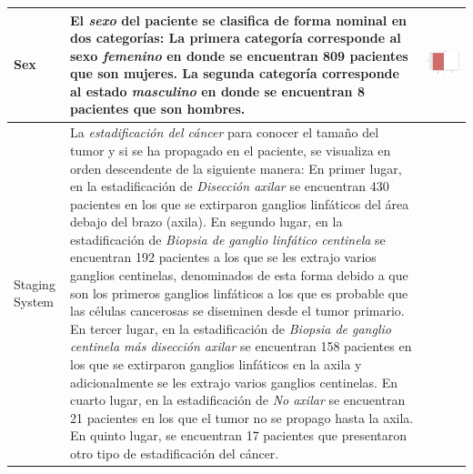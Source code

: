 \begin{table}[!htb]
	\footnotesize
	\begin{threeparttable}
		\begin{tabular}{p{2.5cm} p{7cm} p{6.5cm}} \toprule
			
			Sex
			& El \textit{sexo} del paciente se clasifica de forma nominal en dos categorías: La primera categoría corresponde al sexo \textit{femenino} en donde se encuentran 809 pacientes que son mujeres. La segunda categoría corresponde al estado \textit{masculino} en donde se encuentran 8 pacientes que son hombres.
			
			& \begin{center}\includegraphics[width=1\linewidth]{NOTEBOOK/IMAGENES_DESCRIPTIVAS/39_sex}\end{center}
			\\ \hline
			
					
			Staging System
			& La \textit{estadificación del cáncer} para conocer el tamaño del tumor y si se ha propagado en el paciente, se visualiza en orden descendente de la siguiente manera: En primer lugar, en la estadificación de \textit{Disección axilar} se encuentran 430 pacientes en los que se extirparon ganglios linfáticos del área debajo del brazo (axila). En segundo lugar, en la estadificación de \textit{Biopsia de ganglio linfático centinela} se encuentran 192 pacientes a los que se les extrajo varios ganglios centinelas, denominados de esta forma debido a que son los primeros ganglios linfáticos a los que es probable que las células cancerosas se diseminen desde el tumor primario. En tercer lugar, en la estadificación de \textit{Biopsia de ganglio centinela más disección axilar} se encuentran 158 pacientes en los que se extirparon ganglios linfáticos en la axila y adicionalmente se les extrajo varios ganglios centinelas. En cuarto lugar, en la estadificación de \textit{No axilar} se encuentran 21 pacientes en los que el tumor no se propago hasta la axila. En quinto lugar, se encuentran 17 pacientes que presentaron otro tipo de estadificación del cáncer.
			

\end{tabular}
\end{threeparttable}
\end{table}
